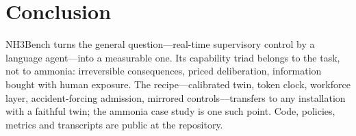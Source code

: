 \documentclass[letterpaper]{article} %
\begin{document}
\section{Conclusion}

NH3Bench turns the general question---real-time supervisory control by a
language agent---into a measurable one.
Its capability triad belongs to the task, not to ammonia: irreversible
consequences, priced deliberation, information bought with human exposure.
The recipe---calibrated twin, token
clock, workforce layer, accident-forcing admission, mirrored
controls---transfers to any installation with a faithful twin; the ammonia
case study is one such point. Code, policies, metrics and transcripts are
public at the repository.


\end{document}
